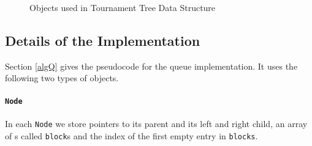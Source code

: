 \begin{figure}
\begin{algorithmic}[1]



\end{algorithmic}
\caption{Objects used in Tournament Tree Data Structure \label{object-fields}}
\end{figure}

\subsection{Details of the Implementation}
Section \ref{algQ} gives the pseudocode for the queue
implementation. It uses the following two types of objects. 
\paragraph{\tt{Node}} 
 In each \texttt{Node} we store pointers to its parent and its left
 and right child, an array of s called \texttt{block}s and
 the index  of the first empty entry in \texttt{blocks}. 

